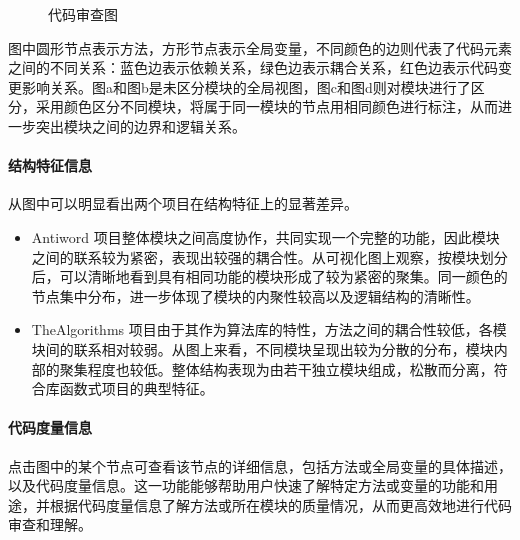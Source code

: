 \begin{figure}[!h]
    \setlength{\subfigcapskip}{-1bp}
    \centering
    \begin{minipage}{\textwidth}
    \centering
    \hspace{2em}
    \end{minipage}
    \centering
    \begin{minipage}{\textwidth}
    \centering
    \hspace{2em}
    \end{minipage}
    \vspace{0.2em}
    \caption{代码审查图} %
\end{figure}


图中圆形节点表示方法，方形节点表示全局变量，不同颜色的边则代表了代码元素之间的不同关系：蓝色边表示依赖关系，绿色边表示耦合关系，红色边表示代码变更影响关系。图a和图b是未区分模块的全局视图，图c和图d则对模块进行了区分，采用颜色区分不同模块，将属于同一模块的节点用相同颜色进行标注，从而进一步突出模块之间的边界和逻辑关系。

\paragraph{结构特征信息} 从图中可以明显看出两个项目在结构特征上的显著差异。
\begin{itemize}
    \item Antiword 项目整体模块之间高度协作，共同实现一个完整的功能，因此模块之间的联系较为紧密，表现出较强的耦合性。从可视化图上观察，按模块划分后，可以清晰地看到具有相同功能的模块形成了较为紧密的聚集。同一颜色的节点集中分布，进一步体现了模块的内聚性较高以及逻辑结构的清晰性。
    
    \item TheAlgorithms 项目由于其作为算法库的特性，方法之间的耦合性较低，各模块间的联系相对较弱。从图上来看，不同模块呈现出较为分散的分布，模块内部的聚集程度也较低。整体结构表现为由若干独立模块组成，松散而分离，符合库函数式项目的典型特征。
\end{itemize}

\paragraph{代码度量信息} 点击图中的某个节点可查看该节点的详细信息，包括方法或全局变量的具体描述，以及代码度量信息。这一功能能够帮助用户快速了解特定方法或变量的功能和用途，并根据代码度量信息了解方法或所在模块的质量情况，从而更高效地进行代码审查和理解。


